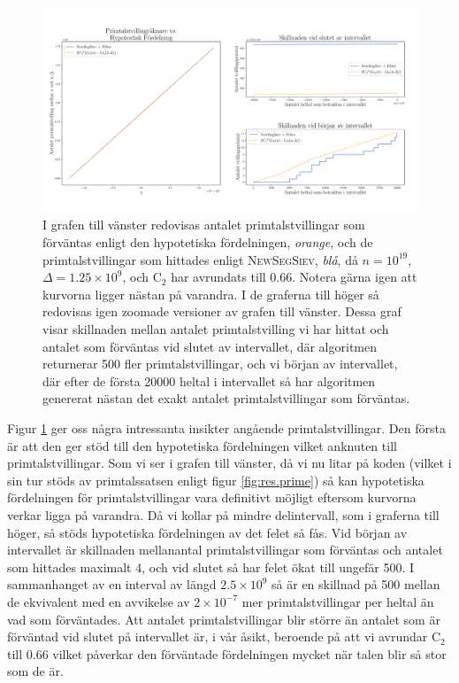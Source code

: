 \begin{figure}[H]
    \centering
    \includegraphics[width = \textwidth]{coen/Images/TwinPrimesNoKapp.pdf}
    \caption{I grafen till vänster redovisas antalet primtalstvillingar som förväntas enligt den hypotetiska fördelningen, \textit{orange}, och de primtalstvillingar som hittades enligt \textsc{NewSegSiev}, \textit{blå}, då \(n = 10^{19}\), \(\Delta = 1.25\times10^9\), och \(\text{C}_2\) har avrundats till 0.66. Notera gärna igen att kurvorna ligger nästan på varandra. I de graferna till höger så redovisas igen zoomade versioner av grafen till vänster. Dessa graf visar skillnaden mellan antalet primtalstvilling vi har hittat och antalet som förväntas vid slutet av intervallet, där algoritmen returnerar 500 fler primtalstvillingar, och vi början av intervallet, där efter de första 20000 heltal i intervallet så har algoritmen genererat nästan det exakt antalet primtalstvillingar som förväntas.}
    \label{fig:res.twins}
\end{figure}

Figur \ref{fig:res.twins} ger oss några intressanta insikter angående primtalstvillingar. 
Den första är att den ger stöd till den hypotetiska fördelningen vilket anknuten till primtalstvillingar. 
Som vi ser i grafen till vänster, då vi nu litar på koden (vilket i sin tur stöds av primtalssatsen enligt figur \ref{fig:res.prime}) så kan hypotetiska fördelningen för primtalstvillingar vara definitivt möjligt eftersom kurvorna verkar ligga på varandra.
Då vi kollar på mindre delintervall, som i graferna till höger, så stöds hypotetiska fördelningen av det felet så fås. 
Vid början av intervallet är skillnaden mellanantal primtalstvillingar som förväntas och antalet som hittades maximalt 4, och vid slutet så har felet ökat till ungefär 500.
I sammanhanget av en interval av längd \(2.5\times10^9\) så är en skillnad på 500 mellan de ekvivalent med en avvikelse av \(2\times 10^{-7}\) mer primtalstvillingar per heltal än vad som förväntades.
Att antalet primtalstvillingar blir större än antalet som är förväntad vid slutet på intervallet är, i vår åsikt, beroende på att vi avrundar \(\text{C}_2\) till 0.66 vilket påverkar den förväntade fördelningen mycket när talen blir så stor som de är.

